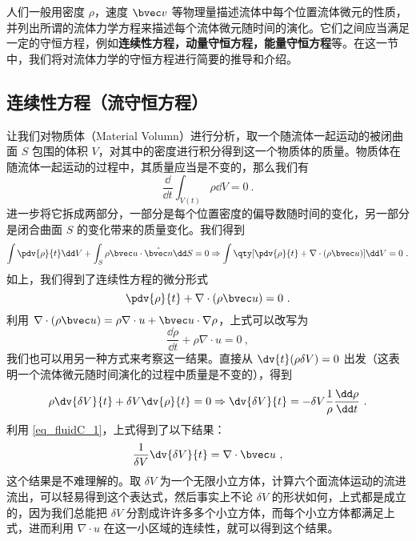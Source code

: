 

人们一般用密度 $\rho$，速度 $\bvec v$ 等物理量描述流体中每个位置流体微元的性质，并列出所谓的流体力学方程来描述每个流体微元随时间的演化。它们之间应当满足一定的守恒方程，例如\textbf{连续性方程，动量守恒方程，能量守恒方程}等。在这一节中，我们将对流体力学的守恒方程进行简要的推导和介绍。
\subsection{连续性方程（流守恒方程）}
让我们对物质体（Material Volumn）进行分析，取一个随流体一起运动的被闭曲面 $S$ 包围的体积 $V$，对其中的密度进行积分得到这一个物质体的质量。物质体在随流体一起运动的过程中，其质量应当是不变的，那么我们有
\begin{equation}
\frac{\dd}{\dd t}\int_{V(t)} \rho \dd V=0~.
\end{equation}
进一步将它拆成两部分，一部分是每个位置密度的偏导数随时间的变化，另一部分是闭合曲面 $S$ 的变化带来的质量变化。我们得到
\begin{equation}
\int \pdv{\rho}{t}\dd V+\int_S \rho \bvec u\cdot \hat{\bvec n}\dd S=0\Rightarrow \int \qty[\pdv{\rho}{t}+\nabla\cdot(\rho\bvec u)]\dd V=0~.
\end{equation}
如上，我们得到了连续性方程的微分形式
\begin{equation}\label{eq_fluidC_6}
\pdv{\rho}{t}+\nabla\cdot(\rho\bvec u)=0~.
\end{equation}
利用 $\nabla\cdot (\rho\bvec u)=\rho \nabla\cdot u+\bvec u\cdot \nabla \rho$，上式可以改写为
\begin{equation}\label{eq_fluidC_1}
\frac{\dd \rho}{\dd t}+\rho \nabla\cdot u=0~,
\end{equation}
我们也可以用另一种方式来考察这一结果。直接从 $\dv{t} (\rho \delta V)=0$ 出发（这表明一个流体微元随时间演化的过程中质量是不变的），得到
\begin{equation}
\rho \dv{\delta V}{t}+\delta V\dv{\rho}{t}=0\Rightarrow \dv{\delta V}{t}=-\delta V \frac{1}{\rho}\frac{\dd \rho}{\dd t}~.
\end{equation}
利用 \autoref{eq_fluidC_1}，上式得到了以下结果：
\begin{equation}
\frac{1}{\delta V}\dv{\delta V}{t}=\nabla\cdot \bvec u~,
\end{equation}
这个结果是不难理解的。取 $\delta V$ 为一个无限小立方体，计算六个面流体运动的流进流出，可以轻易得到这个表达式，然后事实上不论 $\delta V$ 的形状如何，上式都是成立的，因为我们总能把 $\delta V$ 分割成许许多多个小立方体，而每个小立方体都满足上式，进而利用 $\nabla\cdot u$ 在这一小区域的连续性，就可以得到这个结果。
